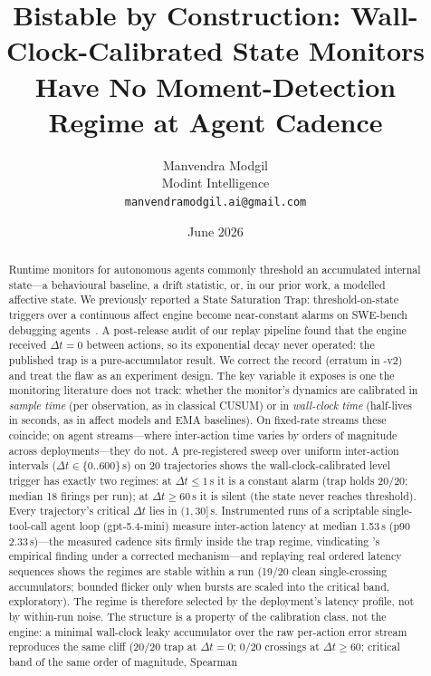 \documentclass{article}
\title{Bistable by Construction: Wall-Clock-Calibrated State Monitors\\
Have No Moment-Detection Regime at Agent Cadence}
\author{%
  Manvendra Modgil\\
  Modint Intelligence\\
  \texttt{manvendramodgil.ai@gmail.com}\\
}
\date{June 2026}
\begin{document}
\maketitle

\begin{abstract}
Runtime monitors for autonomous agents commonly threshold an accumulated
internal state---a behavioural baseline, a drift statistic, or, in our prior
work, a modelled affective state. We previously reported a State Saturation
Trap: threshold-on-state triggers over a continuous affect engine become
near-constant alarms on SWE-bench debugging agents~\cite{P1}. A post-release
audit of our replay pipeline found that the engine received $\Delta t = 0$
between actions, so its exponential decay never operated: the published trap is
a pure-accumulator result. We correct the record (erratum in \cite{P1}-v2) and
treat the flaw as an experiment design. The key variable it exposes is one the
monitoring literature does not track: whether the monitor's dynamics are
calibrated in \emph{sample time} (per observation, as in classical CUSUM) or in
\emph{wall-clock time} (half-lives in seconds, as in affect models and EMA
baselines). On fixed-rate streams these coincide; on agent streams---where
inter-action time varies by orders of magnitude across deployments---they do
not. A pre-registered sweep over uniform inter-action intervals
($\Delta t \in \{0..600\}$\,s) on 20 trajectories shows the
wall-clock-calibrated level trigger has exactly two regimes: at
$\Delta t \le 1$\,s it is a constant alarm (trap holds 20/20; median 18 firings
per run); at $\Delta t \ge 60$\,s it is silent (the state never reaches
threshold). Every trajectory's critical $\Delta t$ lies in $(1, 30]$\,s.
Instrumented runs of a scriptable single-tool-call agent loop (gpt-5.4-mini)
measure inter-action latency at median 1.53\,s (p90 2.33\,s)---the measured
cadence sits firmly inside the trap regime, vindicating \cite{P1}'s empirical
finding under a corrected
mechanism---and replaying real ordered latency sequences shows the regimes are
stable within a run (19/20 clean single-crossing accumulators; bounded flicker
only when bursts are scaled into the critical band, exploratory). The regime is
therefore selected by the deployment's latency profile, not by within-run
noise. The structure is a property of the calibration class, not the engine: a
minimal wall-clock leaky accumulator over the raw per-action error stream
reproduces the same cliff (20/20 trap at $\Delta t = 0$; 0/20 crossings at
$\Delta t \ge 60$; critical band of the same order of magnitude, Spearman

\end{abstract}
\end{document}
